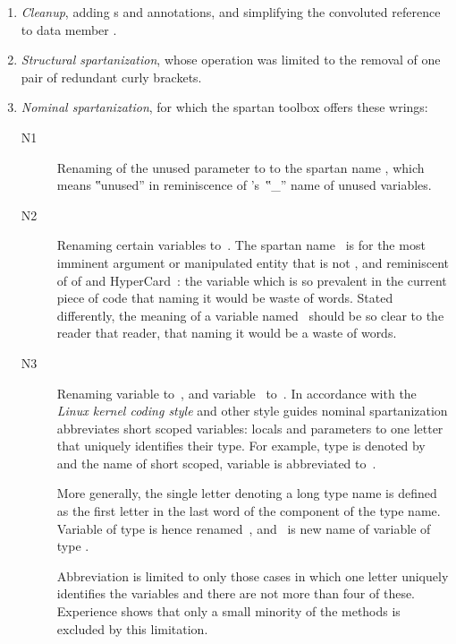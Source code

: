 \begin{enumerate}
  \item \emph{Cleanup}, adding s and  annotations,
      and simplifying the convoluted reference to data member .
    \item \emph{Structural spartanization}, whose operation was limited to the
      removal of one pair of redundant curly brackets.
    \item \emph{Nominal spartanization}, for which the spartan toolbox offers these
      wrings:
      \begin{description}
        \item[N1] Renaming of the unused
      parameter  to  to the spartan name
      \cc{\_\_}, which means ‟unused” in reminiscence of \Prolog's~‟\cc\_”
      name of unused variables.
    \item[N2] Renaming certain variables to~. The
      spartan name~ is for the most imminent argument or manipulated
      entity that is not , and reminiscent of  of \ML and
        \matteo HyperCard~\cite{there:must:be:some:citation:in:our:huge:bib:repository}:
        the variable which is so prevalent in the current piece of code that
        naming it would be waste of words. Stated differently, the
        meaning of a variable named~ should be so clear to the reader that
        reader, that naming it would be a waste of words.

      \item[N3] Renaming variable  to~, and variable~
        to~. In accordance with the \emph{Linux kernel coding style}%
        and other style guides nominal spartanization abbreviates short scoped
        variables: locals and parameters to one letter that uniquely identifies
        their type. For example, type  is denoted by~ and the
        name of short scoped, variable  is abbreviated to~.

        More generally, the single letter denoting a long type name is defined
        as the first letter in the last word of the component of the type name.
        Variable  of type  is hence renamed~,
        and~ is new name of variable  of type .

        Abbreviation is limited to only those cases in which one letter
        uniquely identifies the variables and there are not more than four of
        these. Experience shows that only a small minority of the methods is
        excluded by this limitation.
\end{description}
  \end{enumerate}

